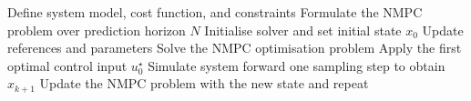 \begin{algorithm}[H]
\caption{Closed-loop NMPC workflow}
\label{alg:nmpc_workflow}
\begin{algorithmic}[1]
\State Define system model, cost function, and constraints
\State Formulate the NMPC problem over prediction horizon \(N\)
\State Initialise solver and set initial state \(x_0\)
    \State Update references and parameters
    \State Solve the NMPC optimisation problem
    \State Apply the first optimal control input \(u_0^\star\)
    \State Simulate system forward one sampling step to obtain \(x_{k+1}\)
    \State Update the NMPC problem with the new state and repeat
\EndWhile
\end{algorithmic}
\end{algorithm}
